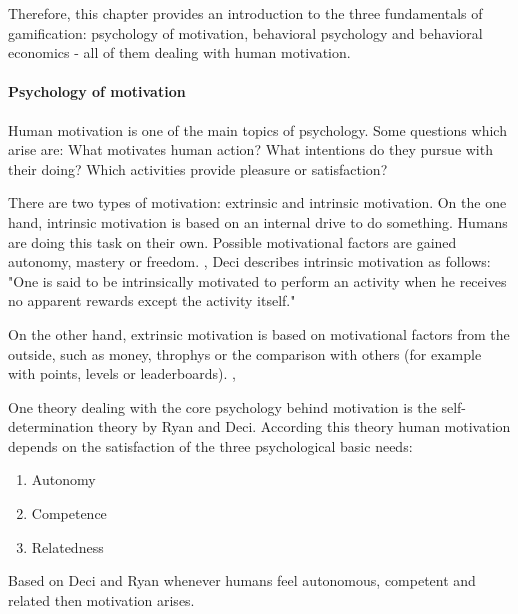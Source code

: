 Therefore, this chapter provides an introduction to the three fundamentals of gamification: psychology of motivation, behavioral psychology and behavioral economics - all of them dealing with human motivation.

\paragraph*{Psychology of motivation}
Human motivation is one of the main topics of psychology. Some questions which arise are: What motivates human action? What intentions do they pursue with their doing? Which activities provide pleasure or satisfaction? \cite[p. 1]{bierhoffeditorEnzyklopaediePsychologieSoziale2016}

There are two types of motivation: extrinsic and intrinsic motivation. 
On the one hand, intrinsic motivation is based on an internal drive to do something. Humans are doing this task on their own. Possible motivational factors are gained autonomy, mastery or freedom. \cite[p. 2, 3, 4]{bierhoffeditorEnzyklopaediePsychologieSoziale2016}, \cite[p. 60, 61]{kumarGamificationWorkDesigning2013} Deci describes intrinsic motivation as follows: "One is said to be intrinsically motivated to perform an activity when he receives no apparent rewards except the activity itself." \cite[p. 105]{deciEffectsExternallyMediated1971}

On the other hand, extrinsic motivation is based on motivational factors from the outside, such as money, throphys or the comparison with others (for example with points, levels or leaderboards). \cite[p. 2, 3, 4]{bierhoffeditorEnzyklopaediePsychologieSoziale2016}, \cite[p. 60, 61]{kumarGamificationWorkDesigning2013}

\label{selfDeterminationTheory}
One theory dealing with the core psychology behind motivation is the self-determination theory by Ryan and Deci. According this theory human motivation depends on the satisfaction of the three psychological basic needs: 
\begin{enumerate}
	\item Autonomy
	\item Competence
	\item Relatedness
\end{enumerate} 
Based on Deci and Ryan whenever humans feel autonomous, competent and related then motivation arises. \cite[p. 416-432]{deciTheoriesSocialPsychology2019}

